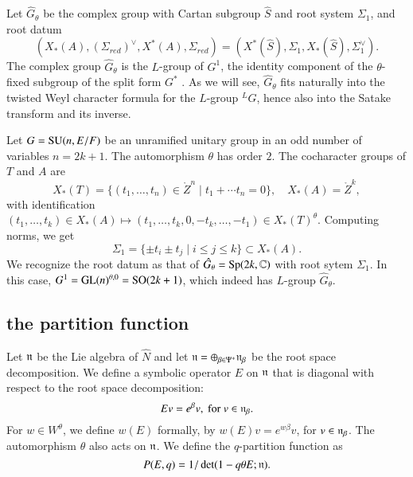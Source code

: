 

Let $\hat G_\theta$ be the complex group with
 Cartan subgroup $\hat S$ and root system 
$\Sigma_1$, and root datum
\[
(X_*(A),(\Sigma_{red})^\vee,X^*(A),\Sigma_{red}) = (X^*(\hat S),\Sigma_1,X_*(\hat S),\Sigma_1^\vee).
\]
The complex group $\hat G_\theta$ is the $L$-group of $G^1$, the identity component of the
$\theta$-fixed subgroup of the split form $G^*$ \cite[\S1.3]{kottwitz1999foundations}.
As we will see, $\hat G_\theta$ fits naturally
into the twisted Weyl character formula for the $L$-group ${}^LG$, hence also into the Satake transform
and its inverse.  

\begin{example}  Let $G={\operatorname{SU}}(n,E/F)$ be an unramified unitary group in an odd number of variables $n=2k+1$.
The automorphism $\theta$ has order $2$.
The cocharacter groups of $T$ and $A$ are
\[
X_*(T) = \{(t_1,\ldots,t_{n})\in \ring{Z}^n\mid t_1+\cdots t_n=0\}, 
\quad
X_*(A)  = \ring{Z}^k,
\]
with identification $(t_1,\ldots,t_k)\in X_*(A)\mapsto (t_1,\ldots,t_k,0,-t_k,\ldots,-t_1)\in X_*(T)^\theta$.
Computing norms, we get
\[
\Sigma_1 = \{\pm t_i\pm t_j\mid i\le j\le k\}\subset X_*(A).
\]
We recognize the root datum as that of $\hat G_\theta = {\operatorname{Sp}}(2k,\mathbb{C})$ with root sytem $\Sigma_1$.  
In this case, $G^1 = {\operatorname{GL}}(n)^{\theta,0} = {\operatorname{SO}}(2k+1)$, which indeed has $L$-group $\hat G_\theta$.
\end{example}







\subsection{the partition function}


Let ${\mathfrak n}$ be the Lie algebra of $\hat N$ and
let ${\mathfrak n} = \oplus_{\beta\in \Psi^+} {\mathfrak n}_\beta$ be the root space decomposition.  We define a symbolic operator $E$ on ${\mathfrak n}$ that is diagonal with
respect to the root space decomposition:
\[
E v = e^{\beta} v, \text{ for } v \in {\mathfrak n}_\beta.
\]
For $w\in W^\theta$, we define $w(E)$ formally, by $w(E) v = e^{ w \beta} v$, for $v\in {\mathfrak n}_\beta$.
The automorphism $\theta$ also acts on ${\mathfrak n}$.  We define the $q$-partition function as
\begin{equation}
P(E,q) = 1/\det(1- q \theta E;{\mathfrak n}).
\end{equation}


